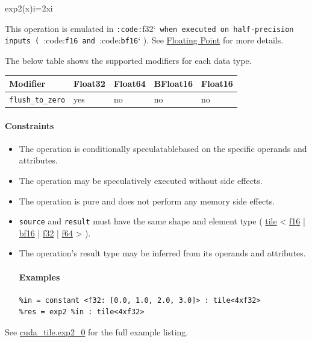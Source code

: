 \documentclass{article}
\begin{document}
exp2(x)i=2xi

This operation is emulated in \texttt{:code:}f32`\texttt{ when executed on half-precision inputs ( }:code:\texttt{f16}\texttt{ and }:code:\texttt{bf16}` ). See \href{https://docs.nvidia.com/cuda/tile-ir/latest/sections/operations.html#op-group-floating-point}{Floating Point} for more details.


The below table shows the supported modifiers for each data type.


\begin{longtable}{l|l|l|l|l}
\hline
Modifier & Float32 & Float64 & BFloat16 & Float16 \\ \hline
\texttt{flush\_to\_zero} & yes & no & no & no \\ \hline
\end{longtable}


\paragraph{Constraints}

\begin{itemize}
\item The operation is conditionally speculatablebased on the specific operands and attributes.
\item The operation may be speculatively executed without side effects.
\item The operation is pure and does not perform any memory side effects.
\item \texttt{source} and \texttt{result} must have the same shape and element type ( \href{https://docs.nvidia.com/cuda/tile-ir/latest/sections/types.html#type-tile}{tile} < \href{https://docs.nvidia.com/cuda/tile-ir/latest/sections/types.html#subsection-element-types}{f16} | \href{https://docs.nvidia.com/cuda/tile-ir/latest/sections/types.html#subsection-element-types}{bf16} | \href{https://docs.nvidia.com/cuda/tile-ir/latest/sections/types.html#subsection-element-types}{f32} | \href{https://docs.nvidia.com/cuda/tile-ir/latest/sections/types.html#subsection-element-types}{f64} > ).
\item The operation's result type may be inferred from its operands and attributes.


\paragraph{Examples}

\begin{lstlisting}
%in = constant <f32: [0.0, 1.0, 2.0, 3.0]> : tile<4xf32>
%res = exp2 %in : tile<4xf32>
\end{lstlisting}

\end{itemize}
See \href{https://docs.nvidia.com/cuda/tile-ir/latest/sections/appendix.html#example-cuda-tile-exp2-0}{cuda\_tile.exp2\_0} for the full example listing.
\end{document}
